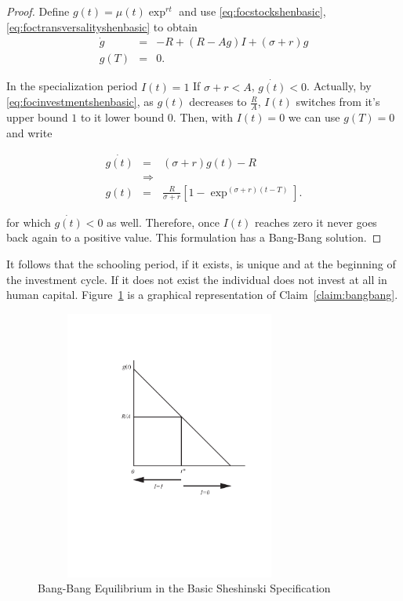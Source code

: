 \begin{proof}
Define $g(t) = \mu(t) \exp^{rt}$ and use \eqref{eq:focstockshenbasic}, \eqref{eq:foctransversalityshenbasic} to obtain
\begin{eqnarray}
\dot{g} &=& -R + (R - Ag)I + (\sigma + r)g \label{eq:gbasicshen} \\ 
g(T) &=& 0.
\end{eqnarray}

\indent In the specialization period $I(t) = 1$  If $\sigma + r < A$, $\dot{g(t)}<0$. Actually, by \eqref{eq:focinvestmentshenbasic}, as $g(t)$ decreases to $\frac{R}{A}$, $I(t)$ switches from it's upper bound $1$ to it lower bound $0$. Then, with $I(t) = 0$ we can use $g(T) = 0$ and write

\begin{eqnarray}
\dot{g(t)} &=& (\sigma + r)g(t) - R \nonumber \\
&\Rightarrow& \nonumber \\ 
g(t) &=& \frac{R}{\sigma + r} \left[1 - \exp^{(\sigma + r)(t-T)} \right] \label{eq:gshenbasei0}.
\end{eqnarray}

\noindent for which $\dot{g(t)}<0$ as well. Therefore, once $I(t)$ reaches zero it never goes back again to a positive value. This formulation has a Bang-Bang solution.
\end{proof}

\indent It follows that the schooling period, if it exists, is unique and at the beginning of the investment cycle. If it does not exist the individual does not invest at all in human capital. Figure~\ref{fig:bangbang} is a graphical representation of Claim~\ref{claim:bangbang}. 

\begin{center}
\begin{figure}[H]
\caption{Bang-Bang Equilibrium in the Basic Sheshinski Specification} \label{fig:bangbang}
\centering
\includegraphics[width=3.5in, height=3.5in]{Figures/fig-shesh-rule.pdf}
\end{figure}
\end{center}

